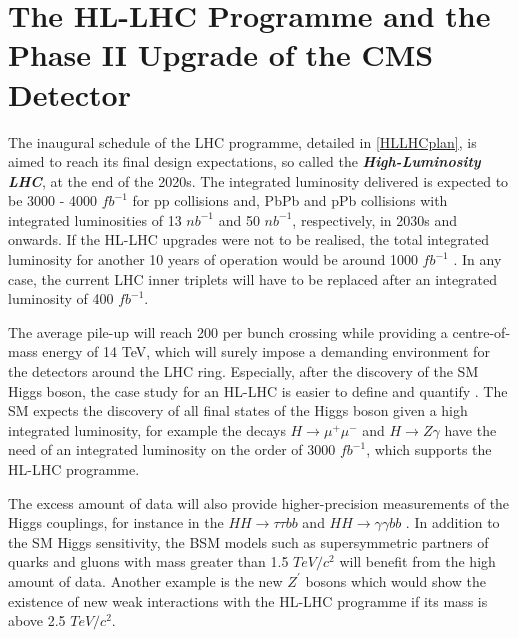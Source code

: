 \section{The HL-LHC Programme and the Phase II Upgrade of the CMS Detector}

The inaugural schedule of the LHC programme, detailed in \autoref{HLLHCplan}, is aimed to reach its final design expectations, so called the \emph{\textbf{High-Luminosity LHC}}, at the end of the 2020s. The integrated luminosity delivered is expected to be 3000 - 4000 $fb^{-1}$ for pp collisions and, PbPb and pPb collisions with integrated luminosities of 13 $nb^{-1}$ and 50 $nb^{-1}$, respectively, in 2030s and onwards. If the HL-LHC upgrades were not to be realised, the total integrated luminosity for another 10 years of operation would be around 1000 $fb^{-1}$ \cite{Aleksan:1628377}. In any case, the current LHC inner triplets will have to be replaced after an integrated luminosity of 400 $fb^{-1}$.

The average pile-up will reach 200 per bunch crossing while providing a centre-of-mass energy of 14 TeV, which will surely impose a demanding environment for the detectors around the LHC ring. Especially, after the discovery of the SM Higgs boson, the case study for an HL-LHC is easier to define and quantify \cite{cmsloi}. The SM expects the discovery of all final states of the Higgs boson given a high integrated luminosity, for example the decays $H\rightarrow\mu^+\mu^-$ and $H\rightarrow Z\gamma$ have the need of an integrated luminosity on the order of 3000 $fb^{-1}$, which supports the HL-LHC programme.

The excess amount of data will also provide higher-precision measurements of the Higgs couplings, for instance in the $HH\rightarrow\tau\tau bb$ and $HH\rightarrow\gamma\gamma bb$ \cite{ATLAS:1502664}. In addition to the SM Higgs sensitivity, the BSM models such as supersymmetric partners of quarks and gluons with mass greater than 1.5 $TeV/c^2$ will benefit from the high amount of data. Another example is the new $Z^\prime$ bosons which would show the existence of new weak interactions with the HL-LHC programme if its mass is above 2.5 $TeV/c^2$.


